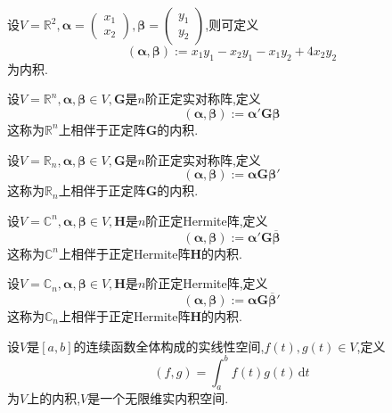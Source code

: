 \begin{brown}
    \begin{example}
        设$V=\mathbb{R}^2,\bm{\alpha}=\begin{pmatrix}
            x_1\\x_2
        \end{pmatrix},\bm{\beta}=\begin{pmatrix}
            y_1\\y_2
        \end{pmatrix}$,则可定义\[
        \left(
            \bm{\alpha},\bm{\beta}
        \right):=x_1y_1-x_2y_1-x_1y_2+4x_2y_2
        \]为内积.
    \end{example}
\end{brown}
\begin{brown}
    \begin{example}
        设$V=\mathbb{R}^n,\bm{\alpha},\bm{\beta}\in V,\bm{G}$是$n$阶正定实对称阵,定义\[
        \left(
            \bm{\alpha},\bm{\beta}
        \right):=\bm{\alpha}'\bm{G}\bm{\beta}
        \]这称为$\mathbb{R}^n$上相伴于正定阵$\bm{G}$的内积.

        设$V=\mathbb{R}_n,\bm{\alpha},\bm{\beta}\in V,\bm{G}$是$n$阶正定实对称阵,定义\[
        \left(
            \bm{\alpha},\bm{\beta}
        \right):=\bm{\alpha}\bm{G}\bm{\beta}'
        \]这称为$\mathbb{R}_n$上相伴于正定阵$\bm{G}$的内积.

        设$V=\mathbb{C}^n,\bm{\alpha},\bm{\beta}\in V,\bm{H}$是$n$阶正定\textup{Hermite}阵,定义\[
        \left(
            \bm{\alpha},\bm{\beta}
        \right):=\bm{\alpha}'\bm{G}\overline{\bm{\beta}}
        \]这称为$\mathbb{C}^n$上相伴于正定\textup{Hermite}阵$\bm{H}$的内积.

        设$V=\mathbb{C}_n,\bm{\alpha},\bm{\beta}\in V,\bm{H}$是$n$阶正定\textup{Hermite}阵,定义\[
        \left(
            \bm{\alpha},\bm{\beta}
        \right):=\bm{\alpha}\bm{G}\overline{\bm{\beta}}'
        \]这称为$\mathbb{C}_n$上相伴于正定\textup{Hermite}阵$\bm{H}$的内积.
    \end{example}
\end{brown}
\begin{brown}
    \begin{example}
        设$V$是$\left[a,b\right]$的连续函数全体构成的实线性空间,$f\left(t\right),g\left(t\right)\in V$,定义\[
        \left(f,g\right)=\int_a^bf\left(t\right)g\left(t\right)\,\mathrm{d} t
        \]为$V$上的内积,$V$是一个无限维实内积空间.
    \end{example}
\end{brown}
